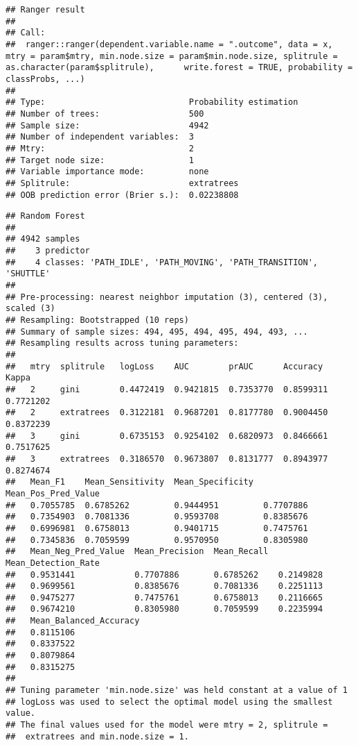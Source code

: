 \documentclass[]{article}
\begin{document}
\begin{verbatim}
## Ranger result
## 
## Call:
##  ranger::ranger(dependent.variable.name = ".outcome", data = x,      mtry = param$mtry, min.node.size = param$min.node.size, splitrule = as.character(param$splitrule),      write.forest = TRUE, probability = classProbs, ...) 
## 
## Type:                             Probability estimation 
## Number of trees:                  500 
## Sample size:                      4942 
## Number of independent variables:  3 
## Mtry:                             2 
## Target node size:                 1 
## Variable importance mode:         none 
## Splitrule:                        extratrees 
## OOB prediction error (Brier s.):  0.02238808
\end{verbatim}

\begin{verbatim}
## Random Forest 
## 
## 4942 samples
##    3 predictor
##    4 classes: 'PATH_IDLE', 'PATH_MOVING', 'PATH_TRANSITION', 'SHUTTLE' 
## 
## Pre-processing: nearest neighbor imputation (3), centered (3), scaled (3) 
## Resampling: Bootstrapped (10 reps) 
## Summary of sample sizes: 494, 495, 494, 495, 494, 493, ... 
## Resampling results across tuning parameters:
## 
##   mtry  splitrule   logLoss    AUC        prAUC      Accuracy   Kappa    
##   2     gini        0.4472419  0.9421815  0.7353770  0.8599311  0.7721202
##   2     extratrees  0.3122181  0.9687201  0.8177780  0.9004450  0.8372239
##   3     gini        0.6735153  0.9254102  0.6820973  0.8466661  0.7517625
##   3     extratrees  0.3186570  0.9673807  0.8131777  0.8943977  0.8274674
##   Mean_F1    Mean_Sensitivity  Mean_Specificity  Mean_Pos_Pred_Value
##   0.7055785  0.6785262         0.9444951         0.7707886          
##   0.7354903  0.7081336         0.9593708         0.8385676          
##   0.6996981  0.6758013         0.9401715         0.7475761          
##   0.7345836  0.7059599         0.9570950         0.8305980          
##   Mean_Neg_Pred_Value  Mean_Precision  Mean_Recall  Mean_Detection_Rate
##   0.9531441            0.7707886       0.6785262    0.2149828          
##   0.9699561            0.8385676       0.7081336    0.2251113          
##   0.9475277            0.7475761       0.6758013    0.2116665          
##   0.9674210            0.8305980       0.7059599    0.2235994          
##   Mean_Balanced_Accuracy
##   0.8115106             
##   0.8337522             
##   0.8079864             
##   0.8315275             
## 
## Tuning parameter 'min.node.size' was held constant at a value of 1
## logLoss was used to select the optimal model using the smallest value.
## The final values used for the model were mtry = 2, splitrule =
##  extratrees and min.node.size = 1.
\end{verbatim}
\end{document}
